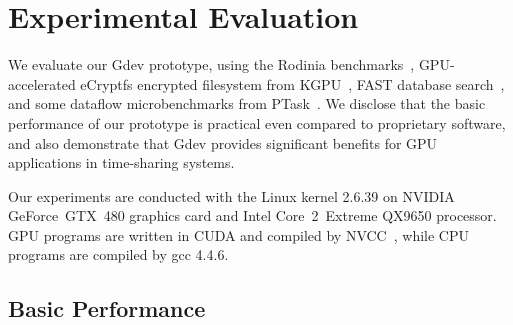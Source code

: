 \vspace{-0.25em}
\section{Experimental Evaluation}
\label{sec:evaluation}
\vspace{-0.25em}

We evaluate our Gdev prototype, using the Rodinia
benchmarks~\cite{Che_IISWC09}, GPU-accelerated eCryptfs encrypted
filesystem from KGPU~\cite{Sun_SYSTOR12}, FAST database
search~\cite{Kim_SIGMOD10}, and some dataflow
microbenchmarks from PTask~\cite{Rossbach_SOSP11}.
We disclose that the basic performance of our prototype is practical
even compared to proprietary software, and also demonstrate that Gdev
provides significant benefits for GPU applications in time-sharing
systems.

Our experiments are conducted with the Linux kernel 2.6.39 on NVIDIA
GeForce~GTX~480 graphics card and Intel Core~2~Extreme QX9650 processor.
GPU programs are written in CUDA and compiled by NVCC~\cite{CUDA40},
while CPU programs are compiled by gcc 4.4.6.

\vspace{-0.25em}
\subsection{Basic Performance}
\vspace{-0.25em}

